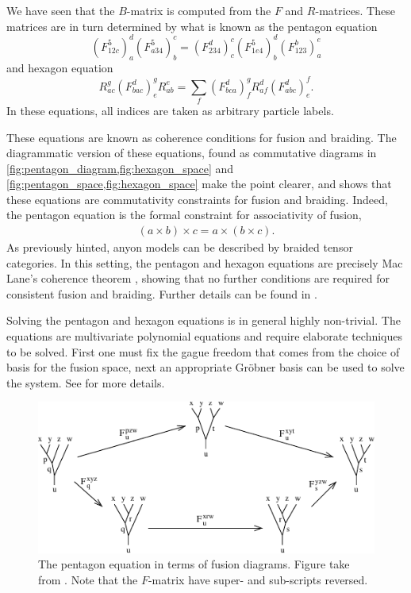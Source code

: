 \documentclass[a4paper,10pt,oneside]{book}
\theoremstyle{plain}
\theoremstyle{definition}
\theoremstyle{remark}
\begin{document}
We have seen that the $B$-matrix is computed from the $F$ and $R$-matrices. These matrices are in turn determined by what is known as the pentagon equation
\begin{equation}\label{eq:pentagon}
  \left(F_{12c}^5\right)^d_a \left(F_{a34}^5\right)^c_b = \left(F_{234}^d\right)_c^c \left( F_{1e4}^5 \right)^d_b \left( F_{123}^b \right)^e_a
\end{equation}
and hexagon equation
\begin{equation}\label{eq:hexagon}
  R_{ac}^g \left(F_{bac}^d\right)^g_e R_{ab}^e = \sum_{f} \left(F_{bca}^d\right)^g_f R_{af}^d \left(F_{abc}^d\right)^f_e.
\end{equation}
In these equations, all indices are taken as arbitrary particle labels.

These equations are known as coherence conditions for fusion and braiding. The diagrammatic version of these equations, found as commutative diagrams in \cref{fig:pentagon_diagram,fig:hexagon_space} and \cref{fig:pentagon_space,fig:hexagon_space} make the point clearer, and shows that these equations are commutativity constraints for fusion and braiding. Indeed, the pentagon equation is the formal constraint for associativity of fusion,
\begin{align*}
  (a \times b) \times c = a \times (b \times c).
\end{align*}
As previously hinted, anyon models can be described by braided tensor categories. In this setting, the pentagon and hexagon equations are precisely Mac Lane's coherence theorem \cite{mac lane}, showing that no further conditions are required for consistent fusion and braiding. Further details can be found in \cite{kitaev,preskill}.

Solving the pentagon and hexagon equations is in general highly non-trivial. The equations are multivariate polynomial equations and require elaborate techniques to be solved. First one must fix the gague freedom that comes from the choice of basis for the fusion space, next an appropriate Gröbner basis can be used to solve the system. See \cite{bonderson} for more details.

\begin{figure}[h]
  \centering
  \includegraphics[width=1\linewidth]{img/pentagon_diagram.pdf}
  \caption{The pentagon equation in terms of fusion diagrams. Figure take from \cite{kitaev}. Note that the $F$-matrix have super- and sub-scripts reversed.}
  \label{fig:pentagon_diagram}
\end{figure}
\end{document}
